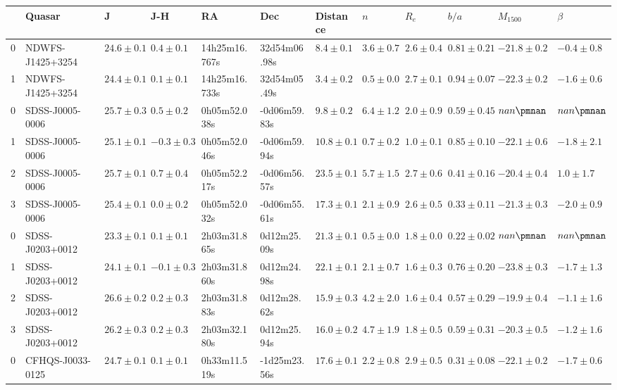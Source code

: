 \begin{tabular}{llllllllllll}
\toprule
{} &            Quasar &             J &           J-H &             RA &           Dec &      Distance &          $n$ &        $R_e$ &          $b/a$ &     $M_{1500}$ &       $\beta$ \\
\midrule
0 &  NDWFS-J1425+3254 &  $24.6\pm0.1$ &   $0.4\pm0.1$ &  14h25m16.767s &  32d54m06.98s &   $8.4\pm0.1$ &  $3.6\pm0.7$ &  $2.6\pm0.4$ &  $0.81\pm0.21$ &  $-21.8\pm0.2$ &  $-0.4\pm0.8$ \\
1 &  NDWFS-J1425+3254 &  $24.4\pm0.1$ &   $0.1\pm0.1$ &  14h25m16.733s &  32d54m05.49s &   $3.4\pm0.2$ &  $0.5\pm0.0$ &  $2.7\pm0.1$ &  $0.94\pm0.07$ &  $-22.3\pm0.2$ &  $-1.6\pm0.6$ \\
0 &   SDSS-J0005-0006 &  $25.7\pm0.3$ &   $0.5\pm0.2$ &   0h05m52.038s &  -0d06m59.83s &   $9.8\pm0.2$ &  $6.4\pm1.2$ &  $2.0\pm0.9$ &  $0.59\pm0.45$ &    $nan\pmnan$ &   $nan\pmnan$ \\
1 &   SDSS-J0005-0006 &  $25.1\pm0.1$ &  $-0.3\pm0.3$ &   0h05m52.046s &  -0d06m59.94s &  $10.8\pm0.1$ &  $0.7\pm0.2$ &  $1.0\pm0.1$ &  $0.85\pm0.10$ &  $-22.1\pm0.6$ &  $-1.8\pm2.1$ \\
2 &   SDSS-J0005-0006 &  $25.7\pm0.1$ &   $0.7\pm0.4$ &   0h05m52.217s &  -0d06m56.57s &  $23.5\pm0.1$ &  $5.7\pm1.5$ &  $2.7\pm0.6$ &  $0.41\pm0.16$ &  $-20.4\pm0.4$ &   $1.0\pm1.7$ \\
3 &   SDSS-J0005-0006 &  $25.4\pm0.1$ &   $0.0\pm0.2$ &   0h05m52.032s &  -0d06m55.61s &  $17.3\pm0.1$ &  $2.1\pm0.9$ &  $2.6\pm0.5$ &  $0.33\pm0.11$ &  $-21.3\pm0.3$ &  $-2.0\pm0.9$ \\
0 &   SDSS-J0203+0012 &  $23.3\pm0.1$ &   $0.1\pm0.1$ &   2h03m31.865s &   0d12m25.09s &  $21.3\pm0.1$ &  $0.5\pm0.0$ &  $1.8\pm0.0$ &  $0.22\pm0.02$ &    $nan\pmnan$ &   $nan\pmnan$ \\
1 &   SDSS-J0203+0012 &  $24.1\pm0.1$ &  $-0.1\pm0.3$ &   2h03m31.860s &   0d12m24.98s &  $22.1\pm0.1$ &  $2.1\pm0.7$ &  $1.6\pm0.3$ &  $0.76\pm0.20$ &  $-23.8\pm0.3$ &  $-1.7\pm1.3$ \\
2 &   SDSS-J0203+0012 &  $26.6\pm0.2$ &   $0.2\pm0.3$ &   2h03m31.883s &   0d12m28.62s &  $15.9\pm0.3$ &  $4.2\pm2.0$ &  $1.6\pm0.4$ &  $0.57\pm0.29$ &  $-19.9\pm0.4$ &  $-1.1\pm1.6$ \\
3 &   SDSS-J0203+0012 &  $26.2\pm0.3$ &   $0.2\pm0.3$ &   2h03m32.180s &   0d12m25.94s &  $16.0\pm0.2$ &  $4.7\pm1.9$ &  $1.8\pm0.5$ &  $0.59\pm0.31$ &  $-20.3\pm0.5$ &  $-1.2\pm1.6$ \\
0 &  CFHQS-J0033-0125 &  $24.7\pm0.1$ &   $0.1\pm0.1$ &   0h33m11.519s &  -1d25m23.56s &  $17.6\pm0.1$ &  $2.2\pm0.8$ &  $2.9\pm0.5$ &  $0.31\pm0.08$ &  $-22.1\pm0.2$ &  $-1.7\pm0.6$ \\

\end{tabular}
